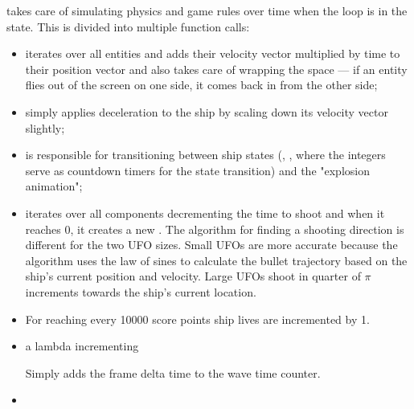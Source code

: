 \documentclass[
  digital, %
  color,   %
  table,   %
  oneside, %
  lof,     %
  lot,     %
]{fithesis3}
\begin{document}
 takes care of simulating physics and game rules
over time when the loop is in the  state.
This is divided into multiple function calls:
\begin{itemize}[-]
    
    \item  {}

    iterates over all entities and adds their velocity vector multiplied
    by time  to their position vector and also takes care
    of wrapping the space — if an entity flies out of the screen on one side,
    it comes back in from the other side;

    \item {}

    simply applies deceleration to the ship by scaling down its velocity vector slightly;

    \item {}

    is responsible for transitioning between ship states
    (, , 
    where the integers serve as countdown timers for the state transition)
    and the "explosion animation";

    \item {}

    iterates over all  components decrementing the time to
    shoot and when it reaches 0, it creates a new .
    The algorithm for finding a shooting direction is different for the two UFO sizes.
    Small UFOs are more accurate because the algorithm uses
    the law of sines to calculate the bullet trajectory based on the ship's current
    position and velocity. Large UFOs shoot in quarter of $\pi$ increments
    towards the ship's current location.

    \item {}

    For reaching every 10000 score points ship lives are incremented by 1.

    \item a lambda incrementing 

    Simply adds the frame delta time  to the wave time counter.

    \item {}


\end{itemize}
\end{document}
